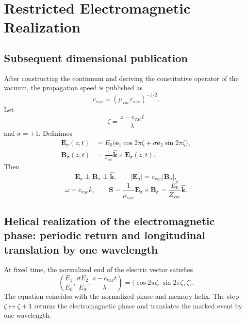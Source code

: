 \chapter{Restricted Electromagnetic Realization}
\label{espiral:chap:realizacion-em}

\section{Subsequent dimensional publication}

After constructing the continuum and deriving the constitutive operator of the
vacuum, the propagation speed is published as
\[
 c_{\mathrm{vac}}=(\mu_{\mathrm{vac}}\varepsilon_{\mathrm{vac}})^{-1/2}.
\]
Let
\[
 \zeta=\frac{z-c_{\mathrm{vac}}t}{\lambda}
\]
and \(\sigma=\pm1\). Definimos
\begin{align}
 \mathbf E_\sigma(z,t)
 &=E_0\bigl(
 \mathbf e_1\cos2\pi\zeta
 +\sigma\mathbf e_2\sin2\pi\zeta\bigr),\\
 \mathbf B_\sigma(z,t)
 &=\frac1{c_{\mathrm{vac}}}\widehat{\mathbf k}
 \times\mathbf E_\sigma(z,t).
 \label{espiral:eq:modo-em-circular}
\end{align}
Then
\[
 \mathbf E_\sigma\perp\mathbf B_\sigma\perp\widehat{\mathbf k},
 \qquad
 |\mathbf E_\sigma|=c_{\mathrm{vac}}|\mathbf B_\sigma|,
\]
\[
 \omega=c_{\mathrm{vac}}k,
 \qquad
 \mathbf S=\frac1{\mu_{\mathrm{vac}}}
 \mathbf E_\sigma\times\mathbf B_\sigma
 =\frac{E_0^2}{Z_{\mathrm{vac}}}\widehat{\mathbf k}.
\]

\section{Helical realization of the electromagnetic phase: periodic return and longitudinal translation by one wavelength}

At fixed time, the normalized end of the electric vector satisfies
\begin{equation}
 \left(
 \frac{E_1}{E_0},\frac{\sigma E_2}{E_0},
 \frac{z-c_{\mathrm{vac}}t}{\lambda}
 \right)
 =\bigl(\cos2\pi\zeta,\sin2\pi\zeta,\zeta\bigr).
 \label{espiral:eq:helice-em-fase-posicion}
\end{equation}
The equation coincides with the normalized phase-and-memory helix. The step
\(\zeta\mapsto\zeta+1\) returns the electromagnetic phase and translates the
marked event by one wavelength.

